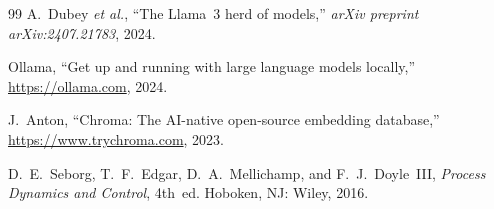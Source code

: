 \documentclass[journal]{IEEEtran}
\begin{document}
\begin{thebibliography}{99}
A.~Dubey \textit{et al.},
``The Llama~3 herd of models,''
\textit{arXiv preprint arXiv:2407.21783}, 2024.

Ollama,
``Get up and running with large language models locally,''
\url{https://ollama.com}, 2024.

J.~Anton,
``Chroma: The AI-native open-source embedding database,''
\url{https://www.trychroma.com}, 2023.

D.~E.~Seborg, T.~F.~Edgar, D.~A.~Mellichamp, and F.~J.~Doyle~III,
\textit{Process Dynamics and Control}, 4th~ed.
Hoboken, NJ: Wiley, 2016.

\end{thebibliography}
\end{document}
